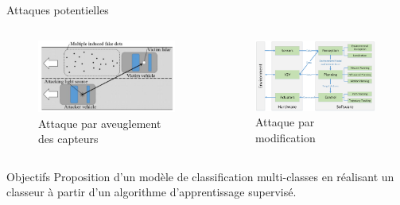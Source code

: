 \documentclass[usenames,dvipsnames]{beamer}
\begin{document}
\begin{frame}{Attaques potentielles}

\begin{columns}

\begin{column}{0.5\textwidth}
\begin{figure}
\centering
\includegraphics[width=\textwidth]{img/blinding.png}
\caption{Attaque par aveuglement des capteurs}
\end{figure}
\end{column}

\begin{column}{0.5\textwidth}
\begin{figure}
\centering
\includegraphics[width=\textwidth]{img/data_flow.png}
\caption{Attaque par modification}
\end{figure}
\end{column}

\end{columns}

\end{frame}


\begin{frame}{Objectifs}
Proposition d'un modèle de classification multi-classes en réalisant un classeur à partir d'un algorithme d'apprentissage supervisé.
\end{frame}
\end{document}
